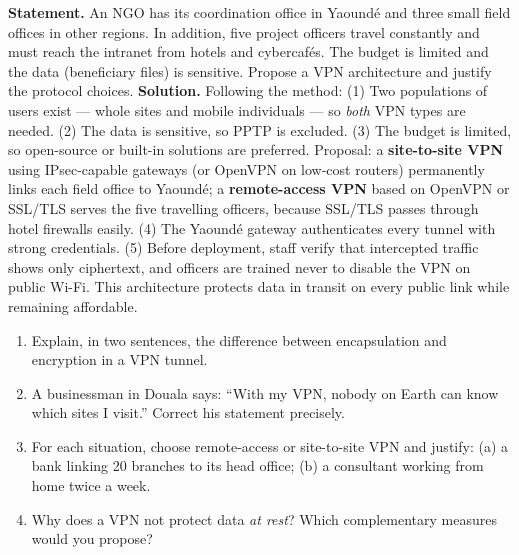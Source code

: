 \documentclass[11pt]{article}
\begin{document}
\begin{exoresolu}
\textbf{Statement.} An NGO has its coordination office in Yaoundé and three small field offices in other regions. In addition, five project officers travel constantly and must reach the intranet from hotels and cybercafés. The budget is limited and the data (beneficiary files) is sensitive. Propose a VPN architecture and justify the protocol choices.
\tcblower
\textbf{Solution.} Following the method: (1) Two populations of users exist — whole sites and mobile individuals — so \emph{both} VPN types are needed. (2) The data is sensitive, so PPTP is excluded. (3) The budget is limited, so open-source or built-in solutions are preferred. Proposal: a \textbf{site-to-site VPN} using IPsec-capable gateways (or OpenVPN on low-cost routers) permanently links each field office to Yaoundé; a \textbf{remote-access VPN} based on OpenVPN or SSL/TLS serves the five travelling officers, because SSL/TLS passes through hotel firewalls easily. (4) The Yaoundé gateway authenticates every tunnel with strong credentials. (5) Before deployment, staff verify that intercepted traffic shows only ciphertext, and officers are trained never to disable the VPN on public Wi-Fi. This architecture protects data in transit on every public link while remaining affordable.
\end{exoresolu}

\begin{exercice}
\begin{enumerate}
\item Explain, in two sentences, the difference between encapsulation and encryption in a VPN tunnel.
\item A businessman in Douala says: ``With my VPN, nobody on Earth can know which sites I visit.'' Correct his statement precisely.
\item For each situation, choose remote-access or site-to-site VPN and justify: (a) a bank linking 20 branches to its head office; (b) a consultant working from home twice a week.
\item Why does a VPN not protect data \emph{at rest}? Which complementary measures would you propose?
\end{enumerate}
\end{exercice}
\end{document}
